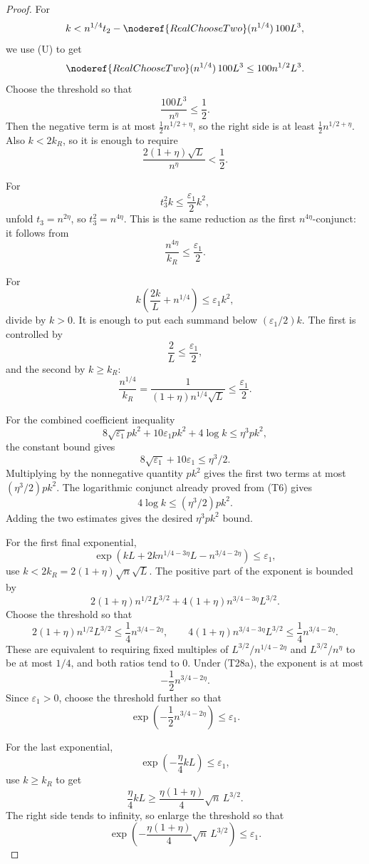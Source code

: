\begin{proof}
For
\[
k< n^{1/4}t_2
-\noderef{RealChooseTwo}(n^{1/4})\,100L^3,
\]
we use (U) to get
\[
\noderef{RealChooseTwo}(n^{1/4})\,100L^3\le100n^{1/2}L^3.
\]
Choose the threshold so that
\[
\frac{100L^3}{n^\eta}\le\frac12. \tag{T24a}
\]
Then the negative term is at most \(\frac12n^{1/2+\eta}\), so the right side
is at least \(\frac12n^{1/2+\eta}\).  Also \(k<2k_R\), so it is enough to
require
\[
\frac{2(1+\eta)\sqrt L}{n^\eta}<\frac12. \tag{T24b}
\]

For
\[
t_3^2k\le\frac{\varepsilon_1}{2}k^2,
\]
unfold \(t_3=n^{2\eta}\), so \(t_3^2=n^{4\eta}\).  This is the same reduction
as the first \(n^{4\eta}\)-conjunct: it follows from
\[
\frac{n^{4\eta}}{k_R}\le\frac{\varepsilon_1}{2}. \tag{T25}
\]

For
\[
k\left(\frac{2k}{L}+n^{1/4}\right)\le\varepsilon_1 k^2,
\]
divide by \(k>0\).  It is enough to put each summand below
\((\varepsilon_1/2)k\).  The first is controlled by
\[
\frac{2}{L}\le\frac{\varepsilon_1}{2}, \tag{T26a}
\]
and the second by \(k\ge k_R\):
\[
\frac{n^{1/4}}{k_R}
=\frac{1}{(1+\eta)n^{1/4}\sqrt L}
\le\frac{\varepsilon_1}{2}. \tag{T26b}
\]

For the combined coefficient inequality
\[
8\sqrt{\varepsilon_1}pk^2+10\varepsilon_1pk^2+4\log k
\le \eta^3pk^2,
\]
the constant bound gives
\[
8\sqrt{\varepsilon_1}+10\varepsilon_1\le\eta^3/2.
\]
Multiplying by the nonnegative quantity \(pk^2\) gives the first two terms at
most \((\eta^3/2)pk^2\).  The logarithmic conjunct already proved from (T6)
gives
\[
4\log k\le(\eta^3/2)pk^2.
\]
Adding the two estimates gives the desired \(\eta^3pk^2\) bound.

For the first final exponential,
\[
\exp\!\left(kL+2kn^{1/4-3\eta}L-n^{3/4-2\eta}\right)\le\varepsilon_1,
\]
use \(k<2k_R=2(1+\eta)\sqrt n\sqrt L\).  The positive part of the exponent is
bounded by
\[
2(1+\eta)n^{1/2}L^{3/2}
+4(1+\eta)n^{3/4-3\eta}L^{3/2}.
\]
Choose the threshold so that
\[
2(1+\eta)n^{1/2}L^{3/2}\le\frac14 n^{3/4-2\eta},
\qquad
4(1+\eta)n^{3/4-3\eta}L^{3/2}\le\frac14 n^{3/4-2\eta}. \tag{T28a}
\]
These are equivalent to requiring fixed multiples of
\(L^{3/2}/n^{1/4-2\eta}\) and \(L^{3/2}/n^\eta\) to be at most \(1/4\), and
both ratios tend to \(0\).  Under (T28a), the exponent is at most
\[
-\frac12 n^{3/4-2\eta}.
\]
Since \(\varepsilon_1>0\), choose the threshold further so that
\[
\exp\!\left(-\frac12 n^{3/4-2\eta}\right)\le\varepsilon_1. \tag{T28b}
\]

For the last exponential,
\[
\exp\!\left(-\frac{\eta}{4}kL\right)\le\varepsilon_1,
\]
use \(k\ge k_R\) to get
\[
\frac{\eta}{4}kL
\ge \frac{\eta(1+\eta)}4\sqrt n\,L^{3/2}.
\]
The right side tends to infinity, so enlarge the threshold so that
\[
\exp\!\left(-\frac{\eta(1+\eta)}4\sqrt n\,L^{3/2}\right)\le\varepsilon_1.
\tag{T29}
\]


\end{proof}
